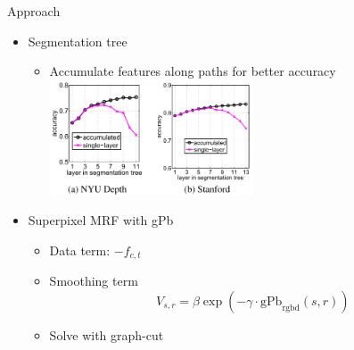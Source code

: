 \documentclass[12pt]{beamer}
\begin{document}
\begin{frame}{Approach}
	\begin{itemize}
		\item Segmentation tree
		\begin{itemize}
			\item Accumulate features along paths for better accuracy \\
			\medskip
			\includegraphics[width=0.5\textwidth]{fig4.png}
		\end{itemize}
		\item Superpixel MRF with gPb
		\begin{itemize}
			\item Data term: $-f_{c, t}$
			\item Smoothing term
			\[V_{s, r} = \beta \exp(-\gamma \cdot \text{gPb}_\text{rgbd}(s, r))\]
			\item Solve with graph-cut
		\end{itemize}
	\end{itemize}
\end{frame}
\end{document}

